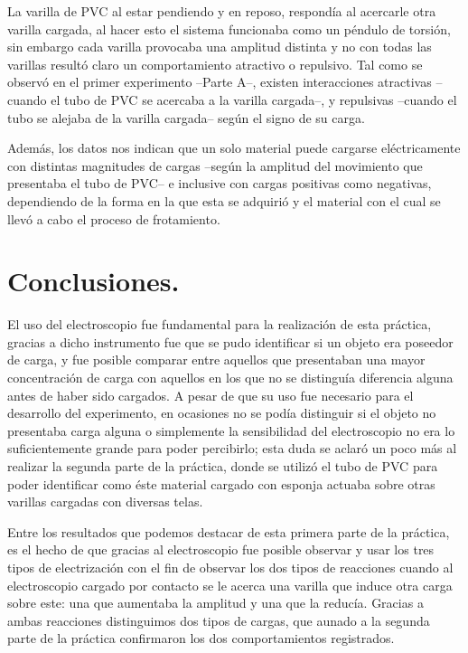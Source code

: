 \documentclass[letterpaper, 11 pt]{article}
\begin{document}
\begin{multicols*}{2}
La varilla de PVC al estar pendiendo y en reposo, respondía al acercarle otra varilla cargada, al hacer esto el sistema funcionaba como un péndulo de torsión, sin embargo cada varilla provocaba una amplitud distinta y no con todas las varillas resultó claro un comportamiento atractivo o repulsivo. Tal como se observó en el primer experimento --Parte A--, existen interacciones atractivas --cuando el tubo de PVC se acercaba a la varilla cargada--, y repulsivas --cuando el tubo se alejaba de la varilla cargada-- según el signo de su carga.

Además, los datos nos indican que un solo material puede cargarse eléctricamente con distintas magnitudes de cargas --según la amplitud del movimiento que presentaba el tubo de PVC-- e inclusive con cargas positivas como negativas, dependiendo de la forma en la que esta se adquirió y el material con el cual se llevó a cabo el proceso de frotamiento. %

\section{Conclusiones.}
El uso del electroscopio fue fundamental para la realización de esta práctica, gracias a dicho instrumento fue que se pudo identificar si un objeto era poseedor de carga, y fue posible comparar entre aquellos que presentaban una mayor concentración de carga con aquellos en los que no se distinguía diferencia alguna antes de haber sido cargados. A pesar de que su uso fue necesario para el desarrollo del experimento, en ocasiones no se podía distinguir si el objeto no presentaba carga alguna o simplemente la sensibilidad del electroscopio no era lo suficientemente grande para poder percibirlo; esta duda se aclaró un poco más al realizar la segunda parte de la práctica, donde se utilizó el tubo de PVC para poder identificar como éste material cargado con esponja actuaba sobre otras varillas cargadas con diversas telas.

Entre los resultados que podemos destacar de esta primera parte de la práctica, es el hecho de que gracias al electroscopio fue posible observar y usar los tres tipos de electrización con el fin de observar los dos tipos de reacciones cuando al electroscopio cargado por contacto se le acerca una varilla que induce otra carga sobre este: una que aumentaba la amplitud y una que la reducía. Gracias a ambas reacciones distinguimos dos tipos de cargas, que aunado a la segunda parte de la práctica confirmaron los dos comportamientos registrados. %


\end{multicols*}
\end{document}
